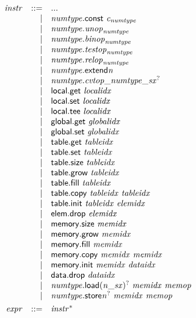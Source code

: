 \documentclass[a4paper]{scrartcl}
\begin{document}
$$
\begin{array}{@{}l@{}rrl@{}l@{}}
& {\mathit{instr}} &::=& ... \\ &&|&
{\mathit{numtype}}.\mathsf{const}~{\mathit{c}}_{{\mathit{numtype}}} \\ &&|&
{\mathit{numtype}} . {\mathit{unop}}_{{\mathit{numtype}}} \\ &&|&
{\mathit{numtype}} . {\mathit{binop}}_{{\mathit{numtype}}} \\ &&|&
{\mathit{numtype}} . {\mathit{testop}}_{{\mathit{numtype}}} \\ &&|&
{\mathit{numtype}} . {\mathit{relop}}_{{\mathit{numtype}}} \\ &&|&
{{\mathit{numtype}}.\mathsf{extend}}{{\mathit{n}}} \\ &&|&
{\mathit{numtype}} . {{{{{\mathit{cvtop}}}{\mathsf{\_}}}{{\mathit{numtype}}}}{\mathsf{\_}}}{{{\mathit{sx}}^?}} \\ &&|&
\mathsf{local.get}~{\mathit{localidx}} \\ &&|&
\mathsf{local.set}~{\mathit{localidx}} \\ &&|&
\mathsf{local.tee}~{\mathit{localidx}} \\ &&|&
\mathsf{global.get}~{\mathit{globalidx}} \\ &&|&
\mathsf{global.set}~{\mathit{globalidx}} \\ &&|&
\mathsf{table.get}~{\mathit{tableidx}} \\ &&|&
\mathsf{table.set}~{\mathit{tableidx}} \\ &&|&
\mathsf{table.size}~{\mathit{tableidx}} \\ &&|&
\mathsf{table.grow}~{\mathit{tableidx}} \\ &&|&
\mathsf{table.fill}~{\mathit{tableidx}} \\ &&|&
\mathsf{table.copy}~{\mathit{tableidx}}~{\mathit{tableidx}} \\ &&|&
\mathsf{table.init}~{\mathit{tableidx}}~{\mathit{elemidx}} \\ &&|&
\mathsf{elem.drop}~{\mathit{elemidx}} \\ &&|&
\mathsf{memory.size}~{\mathit{memidx}} \\ &&|&
\mathsf{memory.grow}~{\mathit{memidx}} \\ &&|&
\mathsf{memory.fill}~{\mathit{memidx}} \\ &&|&
\mathsf{memory.copy}~{\mathit{memidx}}~{\mathit{memidx}} \\ &&|&
\mathsf{memory.init}~{\mathit{memidx}}~{\mathit{dataidx}} \\ &&|&
\mathsf{data.drop}~{\mathit{dataidx}} \\ &&|&
{{\mathit{numtype}}.\mathsf{load}}{{({{{\mathit{n}}}{\mathsf{\_}}}{{\mathit{sx}}})^?}}~{\mathit{memidx}}~{\mathit{memop}} \\ &&|&
{{\mathit{numtype}}.\mathsf{store}}{{{\mathit{n}}^?}}~{\mathit{memidx}}~{\mathit{memop}} \\[0.8ex]
& {\mathit{expr}} &::=& {{\mathit{instr}}^\ast} \\
\end{array}
$$
\end{document}
